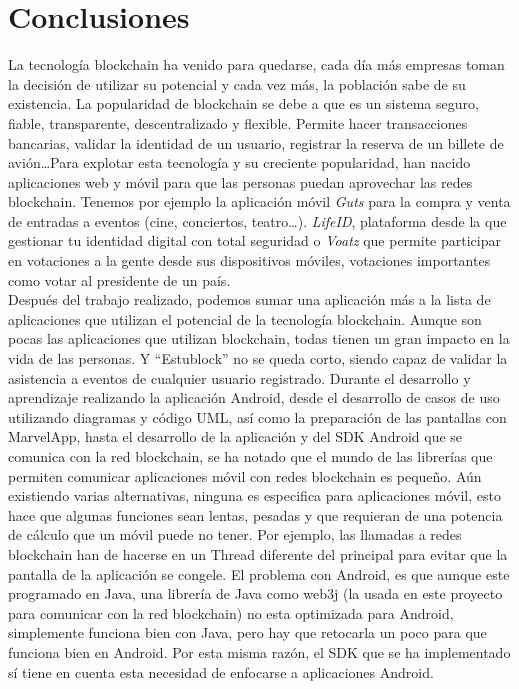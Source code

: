 \chapter{Conclusiones}
\label{cap:Conclusiones}

La tecnología blockchain ha venido para quedarse, cada día más empresas toman la decisión de utilizar su potencial y cada vez más, la población sabe de su existencia. La popularidad de blockchain se debe a que es un sistema seguro, fiable, transparente, descentralizado y flexible. Permite hacer transacciones bancarias, validar la identidad de un usuario, registrar la reserva de un billete de avión\dots Para explotar esta tecnología y su creciente popularidad, han nacido aplicaciones web y móvil para que las personas puedan aprovechar las redes blockchain. Tenemos por ejemplo la aplicación móvil \emph{Guts} para la compra y venta de entradas a eventos (cine, conciertos, teatro\dots). \emph{LifeID}, plataforma desde la que gestionar tu identidad digital con total seguridad o \emph{Voatz} que permite participar en votaciones a la gente desde sus dispositivos móviles, votaciones importantes como votar al presidente de un país. \\

Después del trabajo realizado, podemos sumar una aplicación más a la lista de aplicaciones que utilizan el potencial de la tecnología blockchain. Aunque son pocas las aplicaciones que utilizan blockchain, todas tienen un gran impacto en la vida de las personas. Y ``Estublock'' no se queda corto, siendo capaz de validar la asistencia a eventos de cualquier usuario registrado. Durante el desarrollo y aprendizaje realizando la aplicación Android, desde el desarrollo de casos de uso utilizando diagramas y código UML, así como la preparación de las pantallas con MarvelApp, hasta el desarrollo de la aplicación y del SDK Android que se comunica con la red blockchain, se ha notado que el mundo de las librerías que permiten comunicar aplicaciones móvil con redes blockchain es pequeño. Aún existiendo varias alternativas, ninguna es especifica para aplicaciones móvil, esto hace que algunas funciones sean lentas, pesadas y que requieran de una potencia de cálculo que un móvil puede no tener. Por ejemplo, las llamadas a redes blockchain han de hacerse en un Thread diferente del principal para evitar que la pantalla de la aplicación se congele. El problema con Android, es que aunque este programado en Java, una librería de Java como web3j (la usada en este proyecto para comunicar con la red blockchain) no esta optimizada para Android, simplemente funciona bien con Java, pero hay que retocarla un poco para que funciona bien en Android. Por esta misma razón, el SDK que se ha implementado sí tiene en cuenta esta necesidad de enfocarse a aplicaciones Android. \\

